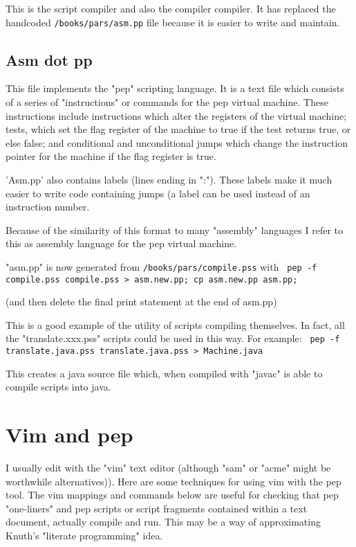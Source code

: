 \documentclass[a4paper,12pt]{article}
\begin{document}
  This is the script compiler and also the compiler compiler. It has replaced
  the handcoded \texttt{/books/pars/asm.pp} file because it is easier to write and maintain.

\subsection{Asm dot pp}

  This file implements the "pep" scripting language. It is a text file which
  consists of a series of "instructions" or commands for the pep virtual
  machine. These instructions include instructions which alter the registers of
  the virtual machine; tests, which set the flag register of the machine to
  true if the test returns true, or else false; and conditional and
  unconditional jumps which change the instruction pointer for the machine if
  the flag register is true.
  
  'Asm.pp' also contains labels (lines ending in ":"). These labels make
  it much easier to write code containing jumps (a label can be used
  instead of an instruction number.

  Because of the similarity of this format to many "assembly" languages
  I refer to this as assembly language for the pep virtual machine.

  "asm.pp" is now generated from \texttt{/books/pars/compile.pss} with 
 \verb| pep -f compile.pss compile.pss > asm.new.pp; cp asm.new.pp asm.pp; |

  (and then delete the final print statement at the end of asm.pp)

  This is a good example of the utility of scripts compiling themselves.
  In fact, all the "translate.xxx.pss" scripts could be used in this way.
  For example: 
 \verb| pep -f translate.java.pss translate.java.pss > Machine.java |


  This creates a java source file which, when compiled with "javac"
  is able to compile scripts into java.

\section{Vim and pep}

  I usually edit with the "vim" text editor (although "sam" or "acme" might
  be worthwhile alternatives)). Here are some techniques for using vim with
  the pep tool. The vim mappings and commands below are useful for checking
  that pep "one-liners" and pep scripts or script fragments contained within a
  text document, actually compile and run. This may be a way of approximating
  Knuth's "literate programming" idea.
\end{document}
